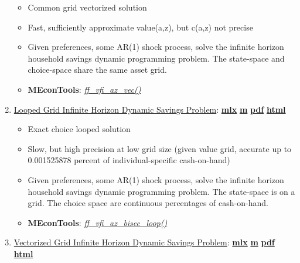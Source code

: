 \documentclass[
]{book}
\providecommand{\tightlist}{%
  \setlength{\itemsep}{0pt}\setlength{\parskip}{0pt}}
\begin{document}
\begin{enumerate}
  \begin{itemize}
  \tightlist
  \item
    Common grid vectorized solution
  \item
    Fast, sufficiently approximate value(a,z), but c(a,z) not precise
  \item
    Given preferences, some AR(1) shock process, solve the infinite horizon household savings dynamic programming problem. The state-space and choice-space share the same asset grid.
  \item
    \textbf{MEconTools}: \emph{\href{https://github.com/FanWangEcon/MEconTools/blob/master/MEconTools/vfi/ff_vfi_az_vec.m}{ff\_vfi\_az\_vec()}}
  \end{itemize}
\item
  \href{https://fanwangecon.github.io/MEconTools/MEconTools/doc/vfi/htmlpdfm/fx_vfi_az_bisec_loop.html}{Looped Grid Infinite Horizon Dynamic Savings Problem}: \href{https://github.com/FanWangEcon/MEconTools/blob/master/MEconTools/doc/vfi/fx_vfi_az_bisec_loop.mlx}{\textbf{mlx}} \textbar{} \href{https://github.com/FanWangEcon/MEconTools/blob/master/MEconTools/doc/vfi/htmlpdfm/fx_vfi_az_bisec_loop.m}{\textbf{m}} \textbar{} \href{https://github.com/FanWangEcon/MEconTools/blob/master/MEconTools/doc/vfi/htmlpdfm/fx_vfi_az_bisec_loop.pdf}{\textbf{pdf}} \textbar{} \href{https://fanwangecon.github.io/MEconTools/MEconTools/doc/vfi/htmlpdfm/fx_vfi_az_bisec_loop.html}{\textbf{html}}

  \begin{itemize}
  \tightlist
  \item
    Exact choice looped solution
  \item
    Slow, but high precision at low grid size (given value grid, accurate up to 0.001525878 percent of individual-specific cash-on-hand)
  \item
    Given preferences, some AR(1) shock process, solve the infinite horizon household savings dynamic programming problem. The state-space is on a grid. The choice space are continuous percentages of cash-on-hand.
  \item
    \textbf{MEconTools}: \emph{\href{https://github.com/FanWangEcon/MEconTools/blob/master/MEconTools/vfi/ff_vfi_az_bisec_loop.m}{ff\_vfi\_az\_bisec\_loop()}}
  \end{itemize}
\item
  \href{https://fanwangecon.github.io/MEconTools/MEconTools/doc/vfi/htmlpdfm/fx_vfi_az_bisec_vec.html}{Vectorized Grid Infinite Horizon Dynamic Savings Problem}: \href{https://github.com/FanWangEcon/MEconTools/blob/master/MEconTools/doc/vfi/fx_vfi_az_bisec_vec.mlx}{\textbf{mlx}} \textbar{} \href{https://github.com/FanWangEcon/MEconTools/blob/master/MEconTools/doc/vfi/htmlpdfm/fx_vfi_az_bisec_vec.m}{\textbf{m}} \textbar{} \href{https://github.com/FanWangEcon/MEconTools/blob/master/MEconTools/doc/vfi/htmlpdfm/fx_vfi_az_bisec_vec.pdf}{\textbf{pdf}} \textbar{} \href{https://fanwangecon.github.io/MEconTools/MEconTools/doc/vfi/htmlpdfm/fx_vfi_az_bisec_vec.html}{\textbf{html}}


\end{enumerate}
\end{document}
